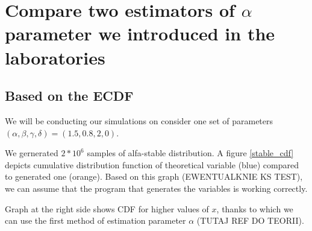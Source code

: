 \documentclass{article}
\begin{document}
		\section{Compare two estimators of $\alpha$ parameter we introduced in the laboratories}
		
		
		\subsection{Based on the ECDF}
		
		We will be conducting our simulations on consider one set of parameters $(\alpha, \beta , \gamma, \delta) = (1.5, 0.8, 2, 0)$.
		
		We gernerated $2*10^6$ samples of alfa-stable distribution. A figure \ref{stable_cdf} depicts cumulative distribution function of theoretical variable (blue) compared to generated one (orange). Based on this graph (EWENTUALKNIE KS TEST), we can assume that the program that generates the variables is working correctly.
		
		Graph at the right side shows CDF for higher values of $x$, thanks to which we can use the first method of estimation parameter $\alpha$ (TUTAJ REF DO TEORII).    
		
\end{document}
